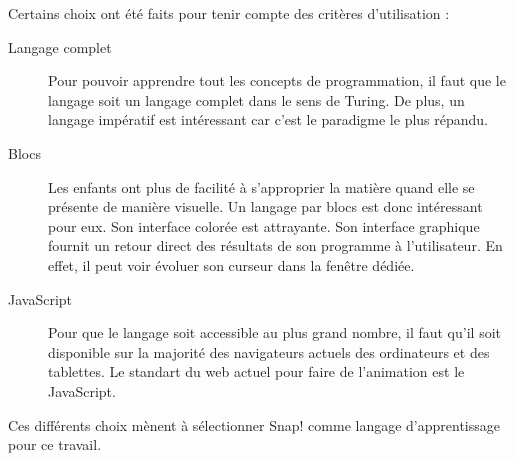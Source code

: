 Certains choix ont été faits pour tenir compte des critères d'utilisation :
\begin{description}
  \item[Langage complet] Pour pouvoir apprendre tout les concepts de programmation, il faut que le langage soit un langage complet dans le sens de Turing.  De plus, un langage impératif est intéressant car c'est le paradigme le plus répandu.
  \item[Blocs] Les enfants ont plus de facilité à s'approprier la matière quand elle se présente de manière visuelle. %
  Un langage par blocs est donc intéressant pour eux. Son interface colorée est attrayante. Son interface graphique fournit un retour direct des résultats de son programme à l'utilisateur. En effet, il peut voir évoluer son curseur dans la fenêtre dédiée.
  \item[JavaScript] Pour que le langage soit accessible au plus grand nombre, il faut qu'il soit disponible sur la majorité des navigateurs actuels des ordinateurs et des tablettes. Le standart du web actuel pour faire de l'animation est le JavaScript.
\end{description}
Ces différents choix mènent à sélectionner Snap! comme langage d'apprentissage pour ce travail.

